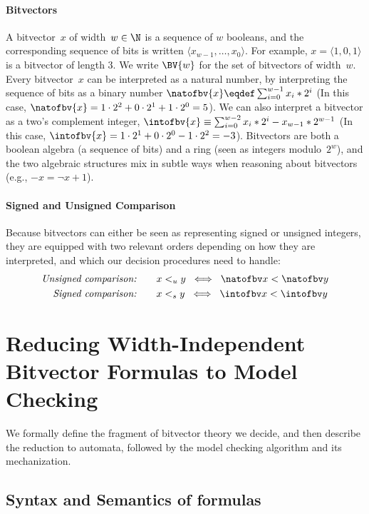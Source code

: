 \paragraph{Bitvectors}
A bitvector~$x$ of width~$w \in \N$ is a sequence of $w$ booleans, and the
corresponding sequence of bits is written $\langle x_{w-1}, \ldots, x_0
\rangle$. For example, $x = \langle 1, 0, 1 \rangle$ is a bitvector of length 3.
%
We write $\BV{w}$ for the set of bitvectors of width~$w$.
%
Every bitvector~$x$ can be interpreted as a natural number, by interpreting the
sequence of bits as a binary number $\natofbv{x} \eqdef \sum_{i=0}^{w-1} x_i *
2^i$ (In this case, $\natofbv{x} = 1 \cdot 2^2 + 0 \cdot 2^1 + 1 \cdot 2^0 =
5$). We can also interpret a bitvector as a two's complement integer,
$\intofbv{x} \equiv \sum_{i=0}^{w-2} x_i * 2^i - x_{w-1} * 2^{w-1}$ (In this
case, $\intofbv{x} = 1 \cdot 2^1 + 0 \cdot 2^0 - 1 \cdot 2^2 = -3$). Bitvectors
are both a boolean algebra (a sequence of bits) and a ring (seen as integers
modulo~$2^w$), and the two algebraic structures mix in subtle ways when reasoning
about bitvectors (e.g., $-x = \lnot x + 1$).

\paragraph{Signed and Unsigned Comparison}
Because bitvectors can either be seen as representing signed or unsigned
integers, they are equipped with two relevant orders depending on how they are
interpreted, and which our decision procedures need to handle:
\begin{align*}
  \textit{Unsigned comparison:}&\qquad x <_u y \;\iff\; \natofbv x < \natofbv y \\
  \textit{Signed comparison:}&\qquad x <_s y \;\iff\; \intofbv x < \intofbv y
\end{align*}

\section{Reducing Width-Independent Bitvector Formulas to Model Checking}
\label{sec:swbv:reduction}

We formally define the fragment of bitvector theory we decide,
and then describe the reduction to automata, followed by the model checking algorithm and its mechanization.

\subsection{Syntax and Semantics of formulas}
\label{sec:swbv:formulas}


